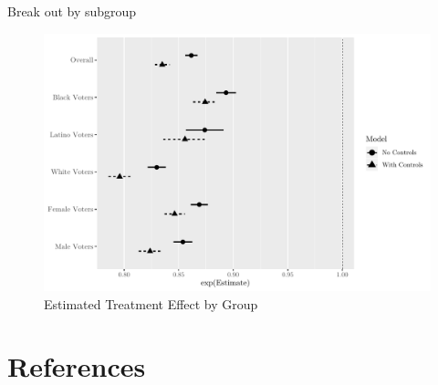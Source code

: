 \documentclass[
  12pt,
]{article}
\begin{document}
\begin{singlespace}


\end{singlespace}

Break out by subgroup

\begin{figure}[H]

{\centering \includegraphics{write_files/figure-latex/dind-groups-1} 

}

\caption{\label{fig:dind-groups}Estimated Treatment Effect by Group}\label{fig:dind-groups}
\end{figure}

\newpage

\hypertarget{references}{%
\section*{References}\label{references}}
\end{document}
